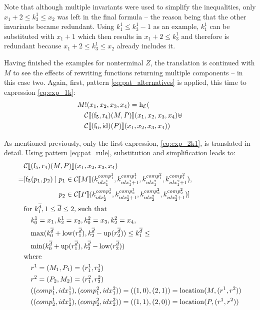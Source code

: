 \documentclass[
    a4paper,
    12pt,
    twoside,
    BCOR=12mm,
    parskip=half,
    chapterprefix,
    numbers=noenddot,
    bibliography=totoc
]{scrbook}
\begin{document}
Note that although multiple invariants were used to simplify the inequalities, only $x_1 + 2 \leq k^1_3 \leq x_2$ was left in the final formula -- the reason being that the other invariants became redundant. Using $k^1_1 \leq k^1_3 -1$ as an example, $k^1_1$ can be substituted with $x_1 + 1$ which then results in $x_1 + 2 \leq k^1_3$ and therefore is redundant because $x_1 + 2 \leq k^1_3 \leq x_2$ already includes it. 

Having finished the examples for nonterminal $Z$, the translation is continued with $M$ to see the effects of rewriting functions returning multiple components -- in this case two. Again, first, pattern \ref{eq:pat_alternatives} is applied, this time to expression \ref{eq:exp_1k}:	
\begin{align}
  &M!(x_1,x_2,x_3,x_4) = \op{h}_\mathcal{E}( \nonumber\\
  &\quad \mathcal{C}\llbracket (\op{f}_5,\op{r}_4)(M,P) \rrbracket(x_1,x_2,x_3,x_4) \uplus \label{eq:exp_2k1} \\
  &\quad \mathcal{C}\llbracket (\op{f}_6,\op{id})(P) \rrbracket(x_1,x_2,x_3,x_4) \nonumber )
\end{align}

As mentioned previously, only the first expression, \ref{eq:exp_2k1}, is translated in detail. Using pattern \ref{eq:pat_rule}, substitution and simplification leads to:	
\begin{align*}
    &\mathcal{C} \llbracket (\op{f}_5,\op{r}_4)(M,P) \rrbracket (x_1,x_2,x_3,x_4) \\
  = &\!\begin{aligned}[t]
    [ \op{f}_5(p_1,p_2) \mid \; &p_1 \in \mathcal{C}\llbracket M \rrbracket (k^{comp^1_1}_{idx^1_1},k^{comp^1_1}_{idx^1_1 + 1},k^{comp^2_1}_{idx^2_1},k^{comp^2_1}_{idx^2_1 + 1}),\\
    &p_2 \in \mathcal{C}\llbracket P \rrbracket (k^{comp^1_2}_{idx^1_2},k^{comp^1_2}_{idx^1_2 + 1},k^{comp^2_2}_{idx^2_2},k^{comp^2_2}_{idx^2_2 + 1})
    ]
    \end{aligned} \\
    &\text{for $k^{\overline{d}}_1, 1 \leq \overline{d} \leq 2$, such that}\\
      &\quad k^1_0 = x_1, k^1_2 = x_2, k^2_0 = x_3, k^2_2 = x_4,\\
      &\quad\!\max(k^{\overline{d}}_0 + \op{low}(r^{\overline{d}}_1), k^{\overline{d}}_2 - \op{up}(r^{\overline{d}}_2)) \leq k^{\overline{d}}_1 \leq\\
      &\quad\!\min(k^{\overline{d}}_0 + \op{up}(r^{\overline{d}}_1), k^{\overline{d}}_2 - \op{low}(r^{\overline{d}}_2))\\
      &\text{where}\\
      &\quad r^1 = (M_1,P_1) = (r^1_1, r^1_2)\\
      &\quad r^2 = (P_2,M_2) = (r^2_1, r^2_2)\\
      &\quad ((comp^1_1, idx^1_1),(comp^2_1, idx^2_1))=((1,0),(2,1))=\op{location}(M,(r^1,r^2))\\
      &\quad ((comp^1_2, idx^1_2),(comp^2_2, idx^2_2))=((1,1),(2,0))=\op{location}(P,(r^1,r^2))
\end{align*}
\end{document}
